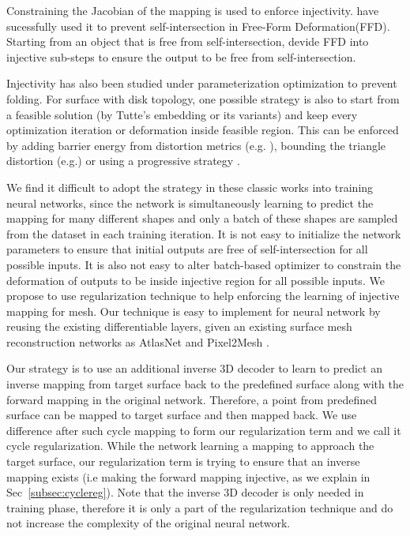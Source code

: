 Constraining the Jacobian of the mapping is used to enforce injectivity. \cite{tvcgprevent} have sucessfully used it to prevent self-intersection in Free-Form Deformation(FFD). Starting from an object that is free from self-intersection, \cite{tvcgprevent} devide FFD into injective sub-steps to ensure the output to be free from self-intersection.

Injectivity has also been studied under parameterization optimization to prevent folding. For surface with disk topology, one possible strategy is also to start from a feasible solution (by Tutte's embedding \cite{tutte} or its variants) and keep every optimization iteration or deformation inside feasible region. This can be enforced by adding barrier energy from distortion metrics (e.g. \cite{provableplanarmapping,lifted_bijection}), bounding the triangle distortion (e.g.\cite{freeboundary,boundeddistortion})
or using a progressive strategy \cite{Liu_PP_2018}. 

We find it difficult to adopt the strategy in these classic works into training neural networks, since the network is simultaneously learning to predict the mapping for many different shapes and only a batch of these shapes are sampled from the dataset in each training iteration. It is not easy to initialize the network parameters to ensure that initial outputs are free of self-intersection for all possible inputs. It is also not easy to alter batch-based optimizer to constrain the deformation of outputs to be inside injective region for all possible inputs. We propose to use regularization technique to help enforcing the learning of injective mapping for mesh. Our technique is easy to implement for neural network by reusing the existing differentiable layers, given an existing surface mesh reconstruction networks as AtlasNet \cite{atlasnet} and Pixel2Mesh \cite{pixel2mesh}.

 Our strategy is to use an additional inverse 3D decoder to learn to predict an inverse mapping from target surface back to the predefined surface along with the forward mapping in the original network. Therefore, a point from predefined surface can be mapped to target surface and then mapped back. We use difference after such cycle mapping to form our regularization term and we call it cycle regularization. While the network learning a mapping to approach the target surface, our regularization term is trying to ensure that an inverse mapping exists (i.e making the forward mapping injective, as we explain in Sec~\ref{subsec:cyclereg}).
Note that the inverse 3D decoder is only needed in training phase, therefore it is only a part of the regularization technique and do not increase the complexity of the original neural network.

